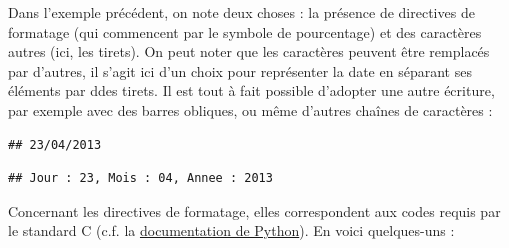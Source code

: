 \documentclass[12pt,]{book}
\newenvironment{Shaded}{\begin{snugshade}}{\end{snugshade}}
\newcommand{\SpecialCharTok}[1]{\textcolor[rgb]{0.00,0.00,0.00}{#1}}
\newcommand{\StringTok}[1]{\textcolor[rgb]{0.31,0.60,0.02}{#1}}
\newcommand{\BuiltInTok}[1]{#1}
\newcommand{\NormalTok}[1]{#1}
\numberwithin{equation}{section}
\numberwithin{countremarque}{section}
\begin{document}
Dans l'exemple précédent, on note deux choses : la présence de
directives de formatage (qui commencent par le symbole de pourcentage)
et des caractères autres (ici, les tirets). On peut noter que les
caractères peuvent être remplacés par d'autres, il s'agit ici d'un choix
pour représenter la date en séparant ses éléments par ddes tirets. Il
est tout à fait possible d'adopter une autre écriture, par exemple avec
des barres obliques, ou même d'autres chaînes de caractères :

\begin{Shaded}
\end{Shaded}

\begin{lstlisting}
## 23/04/2013
\end{lstlisting}

\begin{Shaded}
\end{Shaded}

\begin{lstlisting}
## Jour : 23, Mois : 04, Annee : 2013
\end{lstlisting}

Concernant les directives de formatage, elles correspondent aux codes
requis par le standard C (c.f. la
\href{https://docs.python.org/fr/3/library/datetime.html\#strftime-strptime-behavior}{documentation
de Python}). En voici quelques-uns :
\end{document}
